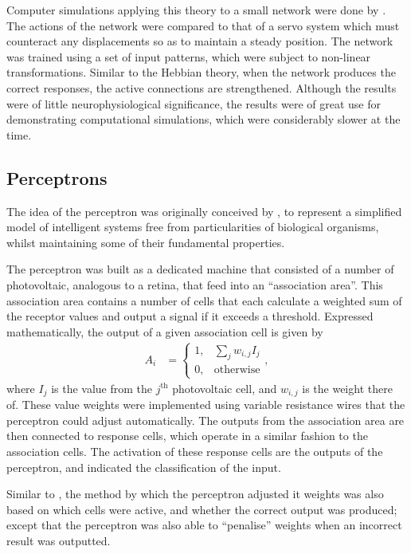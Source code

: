 Computer simulations applying this theory to a small network were done by
\cite{Farley:1954:Simulation}.
The actions of the network were compared to that of a servo system which must
counteract any displacements so as to maintain a steady position.
The network was trained using a set of input patterns, which were subject to
non-linear transformations.
Similar to the Hebbian theory, when the network produces the correct responses,
the active connections are strengthened.
Although the results were of little neurophysiological significance, the results
were of great use for demonstrating computational simulations, which were
considerably slower at the time.


\subsection{Perceptrons}

The idea of the perceptron was originally conceived by
\cite{Rosenblatt:1958:Perceptron}, to represent a simplified model of
intelligent systems free from particularities of biological organisms, whilst
maintaining some of their fundamental properties.

The perceptron was built as a dedicated machine that consisted of a number of
photovoltaic, analogous to a retina, that feed into an ``association area''.
This association area contains a number of cells that each calculate a weighted
sum of the receptor values and output a signal if it exceeds a threshold.
Expressed mathematically, the output of a given association cell is given by
\begin{align*}
    A_i &= \begin{cases}
        1, & \sum_j w_{i,j}I_j\\
        0, & \text{otherwise}
    \end{cases},
\end{align*}
where $I_j$ is the value from the $j^\text{th}$ photovoltaic cell, and $w_{i,j}$
is the weight there of.
These value weights were implemented using variable resistance wires that the
perceptron could adjust automatically.
The outputs from the association area are then connected to response cells,
which operate in a similar fashion to the association cells.
The activation of these response cells are the outputs of the perceptron, and
indicated the classification of the input.

Similar to \cite{Farley:1954:Simulation}, the method by which the perceptron
adjusted it weights was also based on which cells were active, and whether the
correct output was produced; except that the perceptron was also able to
``penalise'' weights when an incorrect result was outputted.

